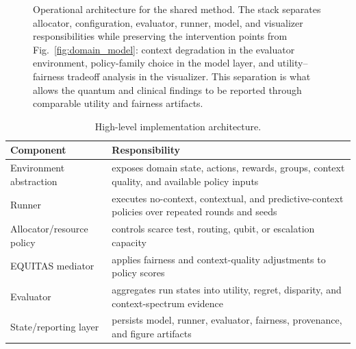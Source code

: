 \documentclass[conference]{IEEEtran}
\begin{document}
\begin{figure}[t]
{}
\caption{Operational architecture for the shared method. The stack separates
allocator, configuration, evaluator, runner, model, and visualizer
responsibilities while preserving the intervention points from
Fig.~\ref{fig:domain_model}: context degradation in the evaluator environment,
policy-family choice in the model layer, and utility--fairness tradeoff
analysis in the visualizer. This separation is what allows the quantum and
clinical findings to be reported through comparable utility and fairness
artifacts.}
\label{fig:operational_framework}
\end{figure}

\begin{table}[t]
\caption{High-level implementation architecture.}
\label{tab:implementation}
\centering
\small
\begin{tabular}{p{}p{}}
\toprule
\textbf{Component} & \textbf{Responsibility} \\
\midrule
Environment abstraction & exposes domain state, actions, rewards, groups, context quality, and available policy inputs \\
Runner & executes no-context, contextual, and predictive-context policies over repeated rounds and seeds \\
Allocator/resource policy & controls scarce test, routing, qubit, or escalation capacity \\
EQUITAS mediator & applies fairness and context-quality adjustments to policy scores \\
Evaluator & aggregates run states into utility, regret, disparity, and context-spectrum evidence \\
State/reporting layer & persists model, runner, evaluator, fairness, provenance, and figure artifacts \\
\bottomrule
\end{tabular}
\end{table}
\end{document}
